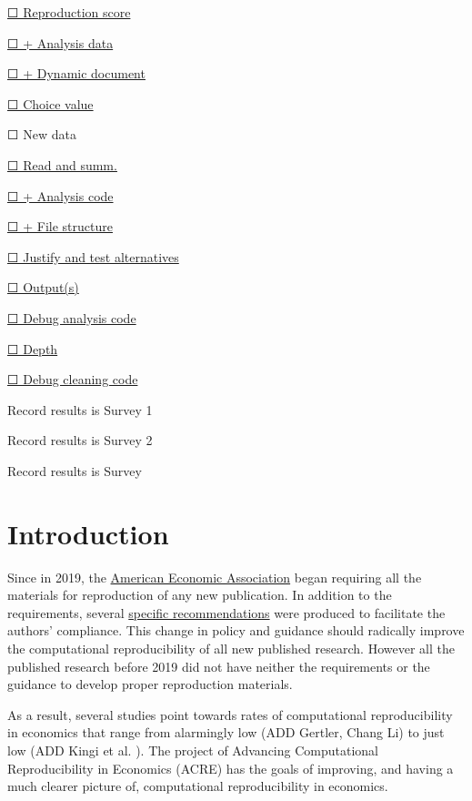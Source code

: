 \documentclass[]{book}
\begin{document}
\protect\hyperlink{score}{☐ Reproduction score}

\protect\hyperlink{ad}{☐ + Analysis data}

\protect\hyperlink{paper-level}{☐ + Dynamic document}

\protect\hyperlink{id-val}{☐ Choice value}

☐ New data

\protect\hyperlink{read-summ}{☐ Read and summ.}

\protect\hyperlink{ac}{☐ + Analysis code}

\protect\hyperlink{paper-level}{☐ + File structure}

\protect\hyperlink{test-rob}{☐ Justify and test alternatives}

\protect\hyperlink{outputs}{☐ Output(s)}

\protect\hyperlink{dac}{☐ Debug analysis code}

\protect\hyperlink{intensive}{☐ Depth}

\protect\hyperlink{dcc}{☐ Debug cleaning code}

Record results is Survey 1

Record results is Survey 2

Record results is Survey

\hypertarget{intro}{%
\chapter{Introduction}\label{intro}}

Since in 2019, the \href{https://www.aeaweb.org/journals/policies/data-code/}{American Economic Association} began requiring all the materials for reproduction of any new publication. In addition to the requirements, several \href{https://aeadataeditor.github.io/aea-de-guidance/}{specific recommendations} were produced to facilitate the authors' compliance. This change in policy and guidance should radically improve the computational reproducibility of all new published research. However all the published research before 2019 did not have neither the requirements or the guidance to develop proper reproduction materials.

As a result, several studies point towards rates of computational reproducibility in economics that range from alarmingly low (ADD Gertler, Chang Li) to just low (ADD Kingi et al. ). The project of Advancing Computational Reproducibility in Economics (ACRE) has the goals of improving, and having a much clearer picture of, computational reproducibility in economics.
\end{document}
